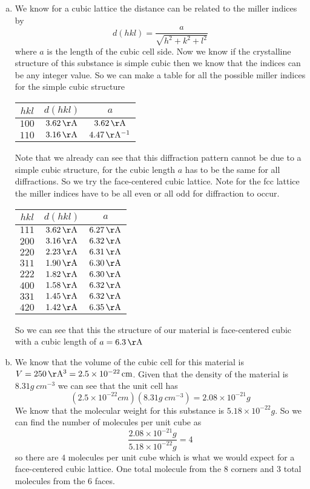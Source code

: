 \documentclass[11pt]{article}
\numberwithin{equation}{section}
\begin{document}
\begin{enumerate}[(a)]
\item
We know for a cubic lattice the distance can be related to the miller indices by
\begin{equation}
d(hkl) = \frac{a}{\sqrt{h^2+k^2+l^2}}
\label{distance}
\end{equation}
where $a$ is the length of the cubic cell side. Now we know if the crystalline structure of this substance is simple cubic then we know that the indices can be any integer value. So we can make a table for all the possible miller indices for the simple cubic structure
\begin{center}
\begin{tabular}{c|c|c}
$hkl$		&$d(hkl)$		&$a$\\
\hline
$100$	&$3.62\unit{\AA}$	&$3.62\unit{\AA}$\\
$110$	&$3.16\unit{\AA}$	&$4.47\unit{\AA^{-1}}$
\end{tabular}
\end{center}
Note that we already can see that this diffraction pattern cannot be due to a simple cubic structure, for the cubic length $a$ has to be the same for all diffractions. So we try the face-centered cubic lattice. Note for the fcc lattice the miller indices have to be all even or all odd for diffraction to occur. 
\begin{center}
\begin{tabular}{c|c|c}
$hkl$		&$d(hkl)$		&$a$\\
\hline
$111$	&$3.62\unit{\AA}$	&$6.27\unit{\AA}$\\
$200$	&$3.16\unit{\AA}$	&$6.32\unit{\AA}$\\
$220$	&$2.23\unit{\AA}$	&$6.31\unit{\AA}$\\
$311$	&$1.90\unit{\AA}$	&$6.30\unit{\AA}$\\
$222$	&$1.82\unit{\AA}$	&$6.30\unit{\AA}$\\
$400$	&$1.58\unit{\AA}$	&$6.32\unit{\AA}$\\
$331$	&$1.45\unit{\AA}$	&$6.32\unit{\AA}$\\
$420$	&$1.42\unit{\AA}$	&$6.35\unit{\AA}$
\end{tabular}
\end{center}
So we can see that this the structure of our material is face-centered cubic with a cubic length of $a=6.3\unit{\AA}$

\item
We know that the volume of the cubic cell for this material is $V = 250\unit{\AA^3} = 2.5\times10^{-22}\unit{cm}$. Given that the density of the material is $8.31\unit{g\ cm^{-3}}$ we can see that the unit cell has
$$(2.5\times10^{-22}\unit{cm})(8.31\unit{g\ cm^{-3}}) = 2.08\times10^{-21}\unit{g}$$
We know that the molecular weight for this substance is $5.18\times10^{-22}\unit{g}$. So we can find the number of molecules per unit cube as
$$\frac{2.08\times10^{-21}\unit{g}}{5.18\times10^{-22}\unit{g}} = 4$$
so there are $4$ molecules per unit cube which is what we would expect for a face-centered cubic lattice. One total molecule from the 8 corners and 3 total molecules from the 6 faces.
\end{enumerate}
\end{document}
